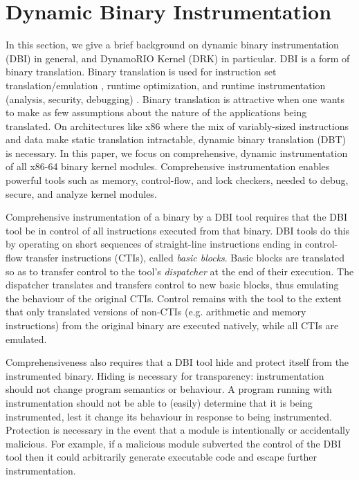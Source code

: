 \documentclass[10pt,preprint]{sigplanconf}
\begin{document}

\section{Dynamic Binary Instrumentation} \label{sec:DBI}

In this section, we give a brief background on dynamic binary instrumentation (DBI) in general, and DynamoRIO Kernel (DRK) in particular. DBI is a form of binary translation. Binary translation is used for instruction set translation/emulation \cite{Qemu2005}, runtime optimization, and runtime instrumentation (analysis, security, debugging) \cite{Ford2008,NaCl,Nethercote2007a}. Binary translation is attractive when one wants to make as few assumptions about the nature of the applications being translated. On architectures like x86 where the mix of variably-sized instructions and data make static translation intractable, dynamic binary translation (DBT) is necessary. In this paper, we focus on comprehensive, dynamic instrumentation of all x86-64 binary kernel modules. Comprehensive instrumentation enables powerful tools such as memory, control-flow, and lock checkers, needed to debug, secure, and analyze kernel modules.

Comprehensive instrumentation of a binary by a DBI tool requires that the DBI tool be in control of all instructions executed from that binary. DBI tools do this by operating on short sequences of straight-line instructions ending in control-flow transfer instructions (CTIs), called \emph{basic blocks}. Basic blocks are translated so as to transfer control to the tool's \emph{dispatcher} at the end of their execution. The dispatcher translates and transfers control to new basic blocks, thus emulating the behaviour of the original CTIs. Control remains with the tool to the extent that only translated versions of non-CTIs (e.g. arithmetic and memory instructions) from the original binary are executed natively, while all CTIs are emulated.

Comprehensiveness also requires that a DBI tool hide and protect itself from the instrumented binary. Hiding is necessary for transparency: instrumentation should not change program semantics or behaviour. A program running with instrumentation should not be able to (easily) determine that it is being instrumented, lest it change its behaviour in response to being instrumented. Protection is necessary in the event that a module is intentionally or accidentally malicious. For example, if a malicious module subverted the control of the DBI tool then it could arbitrarily generate executable code and escape further instrumentation.
\end{document}

